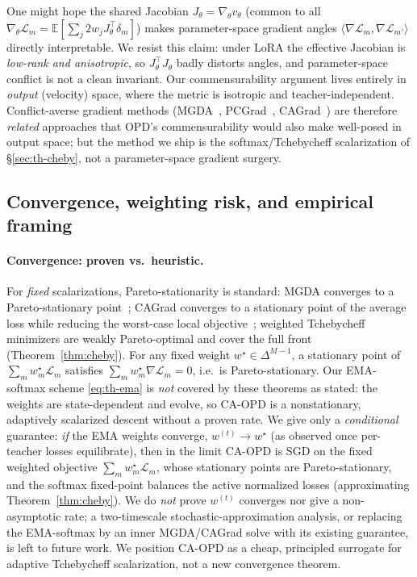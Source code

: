 \begin{remark}
\label{rem:noparamangle}
One might hope the shared Jacobian $J_\theta=\nabla_\theta v_\theta$ (common to all
$\nabla_\theta\mathcal L_m=\mathbb E[\sum_j 2w_j J_\theta^{\!\top}\delta_m]$) makes
parameter-space gradient angles $\langle\nabla\mathcal L_m,\nabla\mathcal L_{m'}\rangle$
directly interpretable. We resist this claim: under LoRA the effective Jacobian is
\emph{low-rank and anisotropic}, so $J_\theta^{\!\top}J_\theta$ badly distorts angles,
and parameter-space conflict is not a clean invariant. Our commensurability argument
lives entirely in \emph{output} (velocity) space, where the metric is isotropic and
teacher-independent. Conflict-averse gradient methods (MGDA~\cite{sener2018multi,desideri2012mgda},
PCGrad~\cite{yu2020gradient}, CAGrad~\cite{liu2021conflict}) are therefore
\emph{related} approaches that OPD's commensurability would also make well-posed in
output space; but the method we ship is the softmax/Tchebycheff scalarization of
\S\ref{sec:th-cheby}, not a parameter-space gradient surgery.
\end{remark}

\subsection{Convergence, weighting risk, and empirical framing}
\label{sec:th-conv}

\paragraph{Convergence: proven vs.\ heuristic.}
For \emph{fixed} scalarizations, Pareto-stationarity is standard: MGDA converges to a
Pareto-stationary point~\cite{desideri2012mgda,sener2018multi}; CAGrad converges to a
stationary point of the average loss while reducing the worst-case local
objective~\cite{liu2021conflict}; weighted Tchebycheff minimizers are weakly
Pareto-optimal and cover the full front (Theorem~\ref{thm:cheby}). For any fixed weight
$w^\star\in\Delta^{M-1}$, a stationary point of $\sum_m w^\star_m\mathcal L_m$ satisfies
$\sum_m w^\star_m\nabla\mathcal L_m=0$, i.e.\ is Pareto-stationary. Our EMA-softmax scheme
\eqref{eq:th-ema} is \emph{not} covered by these theorems as stated: the weights are
state-dependent and evolve, so CA-OPD is a nonstationary, adaptively scalarized descent
without a proven rate. We give only a \emph{conditional} guarantee: \emph{if} the EMA
weights converge, $w^{(t)}\to w^\star$ (as observed once per-teacher losses equilibrate),
then in the limit CA-OPD is SGD on the fixed weighted objective $\sum_m w^\star_m\mathcal L_m$,
whose stationary points are Pareto-stationary, and the softmax fixed-point balances the
active normalized losses (approximating Theorem~\ref{thm:cheby}). We do \emph{not} prove
$w^{(t)}$ converges nor give a non-asymptotic rate; a two-timescale
stochastic-approximation analysis, or replacing the EMA-softmax by an inner MGDA/CAGrad
solve with its existing guarantee, is left to future work. We position CA-OPD as a cheap,
principled surrogate for adaptive Tchebycheff scalarization, not a new convergence
theorem.

